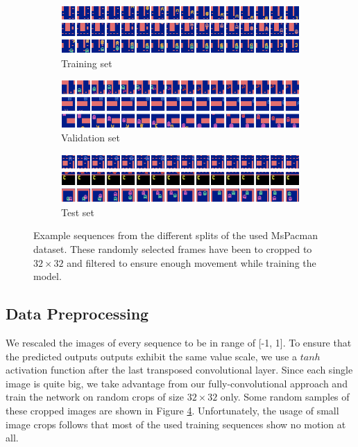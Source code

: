 \begin{figure}[h!tb]
\centering
\begin{subfigure}{1.0\textwidth}
  \centering
  \includegraphics[width=1.0\linewidth]{figures/ds/pac_train.png}
  \caption{Training set}
  \label{fig:pac_train}
  \vspace{.1cm}
\end{subfigure}
\begin{subfigure}{1.0\textwidth}
  \centering
  \includegraphics[width=1.0\linewidth]{figures/ds/pac_valid.png}
  \caption{Validation set}
  \label{fig:pac_valid}
  \vspace{.1cm}
\end{subfigure}
\begin{subfigure}{1.0\textwidth}
  \centering
  \includegraphics[width=1.0\linewidth]{figures/ds/pac_test.png}
  \caption{Test set}
  \label{fig:pac_test}
\end{subfigure}
\caption[MsPacman Crop Image Samples]{Example sequences from the different splits of the used MsPacman dataset. These randomly selected frames have been to cropped to $32 \times 32 $ and filtered to ensure enough movement while training the model.}
\label{fig:pacman}
\end{figure}


\subsection{Data Preprocessing} \label{sec:pacman_preprocessing}

We rescaled the images of every sequence to be in range of [-1, 1]. To ensure that the predicted outputs outputs exhibit the same value scale, we use a $tanh$ activation function after the last transposed convolutional layer. Since each single image is quite big, we take advantage from our fully-convolutional approach and train the network on random crops of size $ 32 \times 32 $ only. Some random samples of these cropped images are shown in Figure \ref{fig:pacman}. Unfortunately, the usage of small image crops follows that most of the used training sequences show no motion at all.

